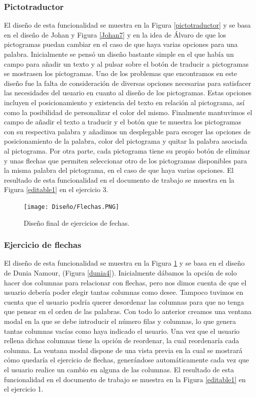\subsubsection{Pictotraductor}
El diseño de esta funcionalidad se muestra en la Figura \ref{pictotraductor} y se basa en el diseño de Johan y Figura \ref{Johan7} y en la idea de Álvaro de que los pictogramas puedan cambiar en el caso de que haya varias opciones para una palabra. Inicialmente se pensó un diseño bastante simple en el que había un campo para añadir un texto y al pulsar sobre el botón de traducir a pictogramas se mostrasen los pictogramas. Uno de los problemas que encontramos en este diseño fue la falta de consideración de diversas opciones necesarias para satisfacer las necesidades del usuario en cuanto al diseño de los pictogramas. Estas opciones incluyen el posicionamiento y existencia del texto en relación al pictograma, así como la posibilidad de personalizar el color del mismo. Finalmente mantuvimos el campo de añadir el texto a traducir y el botón que te muestra los pictogramas con su respectiva palabra y añadimos un desplegable para escoger las opciones de posicionamiento de la palabra, color del pictograma y quitar la palabra asociada al pictograma. Por otra parte, cada pictograma tiene su propio botón de eliminar y unas flechas que permiten seleccionar otro de los pictogramas disponibles para la misma palabra del pictograma, en el caso de que haya varias opciones. El resultado de esta funcionalidad en el documento de trabajo se muestra en la Figura \ref{editable1} en el ejercicio 3.

\begin{figure}[ht!]
  \centering
  \texttt{[image: Diseño/Flechas.PNG]}
  \caption{Diseño final de ejercicios de fechas.}
  \label{flechas}
\end{figure}

\subsubsection{Ejercicio de flechas}
El diseño de esta funcionalidad se muestra en la Figura \ref{flechas} y se basa en el diseño de Dunia Namour, (Figura \ref{dunia4}). Inicialmente dábamos la opción de solo hacer dos columnas para relacionar con flechas, pero nos dimos cuenta de que el usuario debería poder elegir tantas columnas como desee. Tampoco tuvimos en cuenta que el usuario podría querer desordenar las columnas para que no tenga que pensar en el orden de las palabras. Con todo lo anterior creamos una ventana modal en la que se debe introducir el número filas y columnas, lo que genera tantas columnas vacías como haya indicado el usuario. Una vez que el usuario rellena dichas columnas tiene la opción de reordenar, la cual reordenaría cada columna. La ventana modal dispone de una vista previa en la cual se mostrará cómo quedaría el ejercicio de flechas, generándose automáticamente cada vez que el usuario realice un cambio en alguna de las columnas. El resultado de esta funcionalidad en el documento de trabajo se muestra en la Figura \ref{editable1} en el ejercicio 1.


